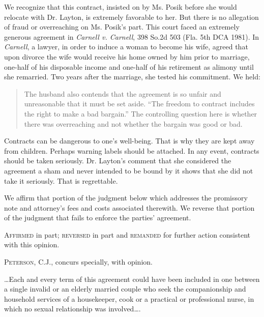 We recognize that this contract, insisted on by Ms. Posik before she would
relocate with Dr. Layton, is extremely favorable to her. But there is no
allegation of fraud or overreaching on Ms. Posik's part. This court faced an
extremely generous agreement in \emph{Carnell v. Carnell}, 398 So.2d 503 (Fla.
5th DCA 1981). In \emph{Carnell}, a lawyer, in order to induce a woman to become
his wife, agreed that upon divorce the wife would receive his home owned by him
prior to marriage, one-half of his disposable income and one-half of his
retirement as alimony until she remarried. Two years after the marriage, she
tested his commitment. We held:
\begin{quote}
The husband also contends that the agreement is so unfair and unreasonable that
it must be set aside. ``The freedom to contract includes the right to make a
bad bargain.'' The controlling question here is whether there was
overreaching and not whether the bargain was good or bad.
\end{quote}

Contracts can be dangerous to one's well-being. That is why they are kept away
from children. Perhaps warning labels should be attached. In any event,
contracts should be taken seriously. Dr. Layton's comment that she considered
the agreement a sham and never intended to be bound by it shows that she did
not take it seriously. That is regrettable.

We affirm that portion of the judgment below which addresses the promissory note
and attorney's fees and costs associated therewith. We reverse that portion of
the judgment that fails to enforce the parties' agreement.

\textsc{Affirmed} in part; \textsc{reversed} in part and \textsc{remanded} for
further action
consistent with this opinion.

\opinion \textsc{Peterson}, C.J., concurs specially, with opinion.

\dots Each and every term of this agreement could have been included in one
between a single invalid or an elderly married couple who seek the
companionship and household services of a housekeeper, cook or a practical or
professional nurse, in which no sexual relationship was involved\dots.

